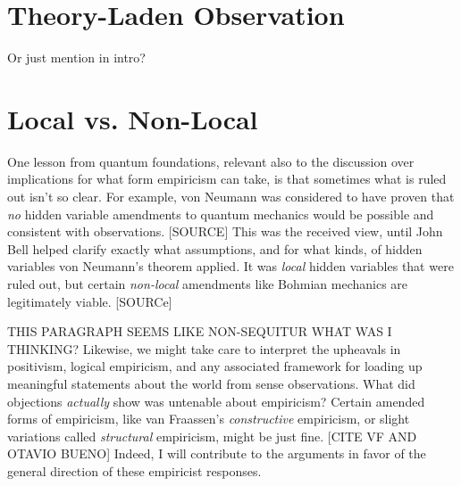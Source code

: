 






\section{Theory-Laden Observation}

Or just mention in intro?



\section{Local vs. Non-Local}

One lesson from quantum foundations, relevant also to the discussion over implications for what form empiricism can take, is that sometimes what is ruled out isn't so clear.  For example, von Neumann was considered to have proven that \emph{no} hidden variable amendments to quantum mechanics would be possible and consistent with observations.  [SOURCE]  This was the received view, until John Bell helped clarify exactly what assumptions, and for what kinds, of hidden variables von Neumann's theorem applied.  It was \emph{local} hidden variables that were ruled out, but certain \emph{non-local} amendments like Bohmian mechanics are legitimately viable.  [SOURCe]


THIS PARAGRAPH SEEMS LIKE NON-SEQUITUR WHAT WAS I THINKING?
Likewise, we might take care to interpret the upheavals in positivism, logical empiricism, and any associated framework for loading up meaningful statements about the world from sense observations.  What did objections \emph{actually} show was untenable about empiricism?  Certain amended forms of empiricism, like van Fraassen's \emph{constructive} empiricism, or slight variations called \emph{structural} empiricism, might be just fine.  [CITE VF AND OTAVIO BUENO]  Indeed, I will contribute to the arguments in favor of the general direction of these empiricist responses. 

